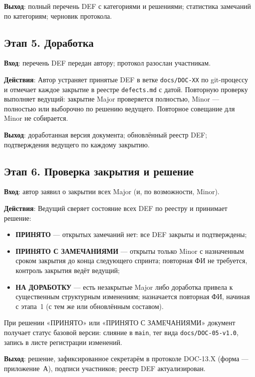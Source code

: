 \documentclass[12pt,a4paper]{article}
\newcommand{\reqfield}[1]{\textbf{#1}:} %
\begin{document}
\reqfield{Выход} полный перечень DEF с категориями и решениями; статистика
замечаний по категориям; черновик протокола.

\subsection{Этап 5. Доработка}

\reqfield{Вход} перечень DEF передан автору; протокол разослан участникам.

\reqfield{Действия} Автор устраняет принятые DEF в ветке \texttt{docs/DOC-XX}
по git-процессу и отмечает каждое закрытие в реестре \texttt{defects.md} с
датой. Повторную проверку выполняет ведущий: закрытие Major проверяется
полностью, Minor --- полностью или выборочно по решению ведущего. Повторное
совещание для Minor не собирается.

\reqfield{Выход} доработанная версия документа; обновлённый реестр DEF;
подтверждения ведущего по каждому закрытию.

\subsection{Этап 6. Проверка закрытия и решение}

\reqfield{Вход} автор заявил о закрытии всех Major (и, по возможности, Minor).

\reqfield{Действия} Ведущий сверяет состояние всех DEF по реестру и принимает
решение:
\begin{itemize}
  \item \textbf{ПРИНЯТО} --- открытых замечаний нет: все DEF закрыты и
        подтверждены;
  \item \textbf{ПРИНЯТО С ЗАМЕЧАНИЯМИ} --- открыты только Minor с назначенным
        сроком закрытия до конца следующего спринта; повторная ФИ не
        требуется, контроль закрытия ведёт ведущий;
  \item \textbf{НА ДОРАБОТКУ} --- есть незакрытые Major либо доработка
        привела к существенным структурным изменениям; назначается повторная
        ФИ, начиная с этапа~1 (с тем же или обновлённым составом).
\end{itemize}
При решении «ПРИНЯТО» или «ПРИНЯТО С ЗАМЕЧАНИЯМИ» документ получает статус
базовой версии: слияние в \texttt{main}, тег вида \texttt{docs/DOC-05-v1.0},
запись в листе регистрации изменений.

\reqfield{Выход} решение, зафиксированное секретарём в протоколе DOC-13.X
(форма --- приложение~А), подписи участников; реестр DEF актуализирован.
\end{document}
